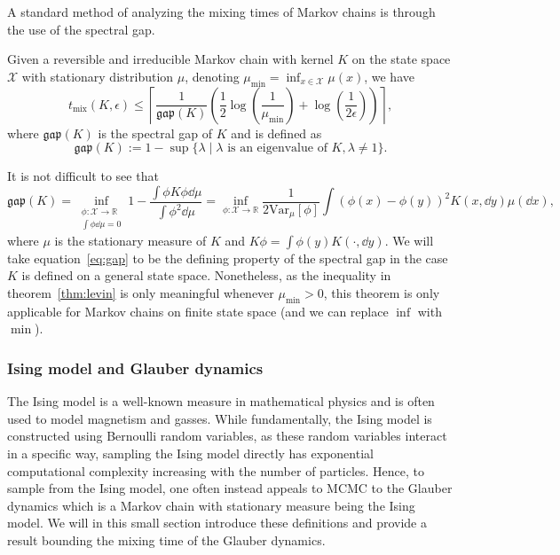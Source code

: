A standard method of analyzing the mixing times of Markov chains is through the use of the spectral gap. 


\begin{theorem}\label{thm:levin}
  Given a reversible and irreducible Markov chain with kernel \(K\) on the state space \(\mathcal{X}\) 
  with stationary distribution \(\mu\), denoting \(\mu_{\min} = \inf_{x \in \mathcal{X}} \mu(x)\), we have 
  \[t_{\text{mix}}(K, \epsilon) \le \left\lceil\frac{1}{\mathfrak{gap}(K)}
  \left(\frac{1}{2}\log\left(\frac{1}{\mu_{\min}}\right) + \log\left(\frac{1}{2\epsilon}\right)\right)\right\rceil,\]
  where \(\mathfrak{gap}(K)\) is the spectral gap of \(K\) and is defined as
  \[\mathfrak{gap}(K) := 1 - \sup\{\lambda \mid \lambda \text{ is an eigenvalue of } K, \lambda \neq 1\}.\]
\end{theorem}

It is not difficult to see that 
\begin{equation}\label{eq:gap}
  \mathfrak{gap}(K) = 
    \inf_{\substack{\phi : \mathcal{X} \to \mathbb{R}\\ \int \phi \dd \mu = 0}} 1 
      - \frac{\int \phi K \phi \dd \mu}{\int \phi^2 \dd \mu}
    = \inf_{\phi : \mathcal{X} \to \mathbb{R}} 
      \frac{1}{2 \text{Var}_\mu[\phi]} \int (\phi(x) - \phi(y))^2 K(x, \dd y) \mu(\dd x),
\end{equation}
where \(\mu\) is the stationary measure of \(K\) and \(K\phi = \int \phi(y) K(\cdot, \dd y)\). We will take 
equation~\eqref{eq:gap} to be the defining property of the spectral gap in the case \(K\) is defined on 
a general state space. Nonetheless, as the inequality in theorem~\ref{thm:levin} is only meaningful whenever 
\(\mu_{\min} > 0\), this theorem is only applicable for Markov chains on finite state space 
(and we can replace \(\inf\) with \(\min\)).

\subsubsection{Ising model and Glauber dynamics}

The Ising model is a well-known measure in mathematical physics and is often used to model magnetism and 
gasses. While fundamentally, the Ising model is constructed using Bernoulli random variables, as these 
random variables interact in a specific way, sampling the Ising model directly has exponential computational 
complexity increasing with the number of particles. Hence, to sample from the Ising model, one often instead 
appeals to MCMC to the Glauber dynamics which is a Markov chain with stationary measure being the Ising model.
We will in this small section introduce these definitions and provide a result bounding the mixing time 
of the Glauber dynamics.

